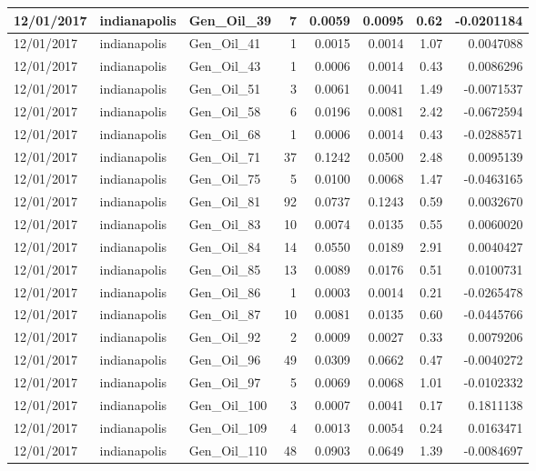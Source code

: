 \documentclass[
  letterpaper,
  DIV=11,
  numbers=noendperiod]{scrartcl}
\begin{document}
\begin{tabular}{l|l|l|r|r|r|r|r}
\hline
12/01/2017 & indianapolis & Gen\_Oil\_39 & 7 & 0.0059 & 0.0095 & 0.62 & -0.0201184\\
\hline
12/01/2017 & indianapolis & Gen\_Oil\_41 & 1 & 0.0015 & 0.0014 & 1.07 & 0.0047088\\
\hline
12/01/2017 & indianapolis & Gen\_Oil\_43 & 1 & 0.0006 & 0.0014 & 0.43 & 0.0086296\\
\hline
12/01/2017 & indianapolis & Gen\_Oil\_51 & 3 & 0.0061 & 0.0041 & 1.49 & -0.0071537\\
\hline
12/01/2017 & indianapolis & Gen\_Oil\_58 & 6 & 0.0196 & 0.0081 & 2.42 & -0.0672594\\
\hline
12/01/2017 & indianapolis & Gen\_Oil\_68 & 1 & 0.0006 & 0.0014 & 0.43 & -0.0288571\\
\hline
12/01/2017 & indianapolis & Gen\_Oil\_71 & 37 & 0.1242 & 0.0500 & 2.48 & 0.0095139\\
\hline
12/01/2017 & indianapolis & Gen\_Oil\_75 & 5 & 0.0100 & 0.0068 & 1.47 & -0.0463165\\
\hline
12/01/2017 & indianapolis & Gen\_Oil\_81 & 92 & 0.0737 & 0.1243 & 0.59 & 0.0032670\\
\hline
12/01/2017 & indianapolis & Gen\_Oil\_83 & 10 & 0.0074 & 0.0135 & 0.55 & 0.0060020\\
\hline
12/01/2017 & indianapolis & Gen\_Oil\_84 & 14 & 0.0550 & 0.0189 & 2.91 & 0.0040427\\
\hline
12/01/2017 & indianapolis & Gen\_Oil\_85 & 13 & 0.0089 & 0.0176 & 0.51 & 0.0100731\\
\hline
12/01/2017 & indianapolis & Gen\_Oil\_86 & 1 & 0.0003 & 0.0014 & 0.21 & -0.0265478\\
\hline
12/01/2017 & indianapolis & Gen\_Oil\_87 & 10 & 0.0081 & 0.0135 & 0.60 & -0.0445766\\
\hline
12/01/2017 & indianapolis & Gen\_Oil\_92 & 2 & 0.0009 & 0.0027 & 0.33 & 0.0079206\\
\hline
12/01/2017 & indianapolis & Gen\_Oil\_96 & 49 & 0.0309 & 0.0662 & 0.47 & -0.0040272\\
\hline
12/01/2017 & indianapolis & Gen\_Oil\_97 & 5 & 0.0069 & 0.0068 & 1.01 & -0.0102332\\
\hline
12/01/2017 & indianapolis & Gen\_Oil\_100 & 3 & 0.0007 & 0.0041 & 0.17 & 0.1811138\\
\hline
12/01/2017 & indianapolis & Gen\_Oil\_109 & 4 & 0.0013 & 0.0054 & 0.24 & 0.0163471\\
\hline
12/01/2017 & indianapolis & Gen\_Oil\_110 & 48 & 0.0903 & 0.0649 & 1.39 & -0.0084697\\

\end{tabular}
\end{document}
